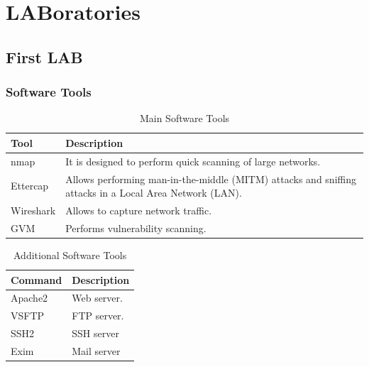 \chapter{LABoratories}

\section{First LAB}
\cite{LAB1}

\subsection{Software Tools}
\begin{table}[H]
    \centering
    \begin{tabular}{|p{3cm}|p{7cm}|}\hline
        \rowcolor{gray!30}
		\textbf{Tool} & \textbf{Description}  \\ \hline
		nmap
			& It is designed to perform quick scanning of large networks.
			\\ \hline
        Ettercap
			& Allows performing man-in-the-middle (MITM) attacks and sniffing attacks in a Local Area Network (LAN).
			\\ \hline
        Wireshark 
            & Allows to capture network traffic.
            \\ \hline
        GVM 
            & Performs vulnerability scanning.
            \\ \hline
    \end{tabular}

    \caption{Main Software Tools}

    \label{tab:mainSoftwareTools}
\end{table}

\begin{table}[H]
    \centering
    \begin{tabular}{|p{3cm}|p{7cm}|}\hline
        \rowcolor{gray!30}
		\textbf{Command} & \textbf{Description} \\ \hline
		Apache2
			& Web server.
			\\ \hline
        VSFTP
			& FTP server.
			\\ \hline
        SSH2
            & SSH server
            \\ \hline
        Exim
            & Mail server
            \\ \hline
    \end{tabular}

    \caption{Additional Software Tools}

    \label{tab:additionalSoftwareTools}
\end{table}

